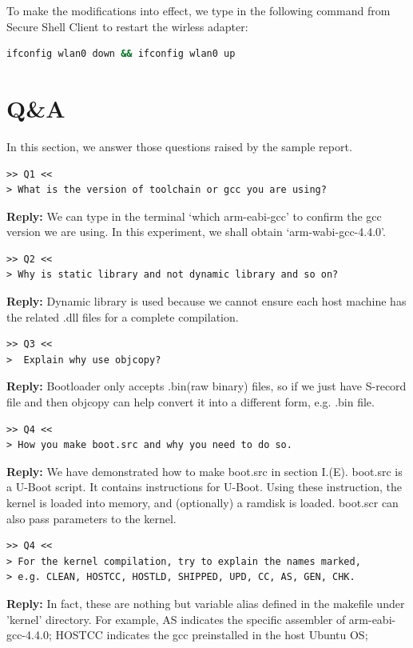 \documentclass[12pt,journal,draftclsnofoot,onecolumn]{IEEEtran}
\begin{document}
To make the modifications into effect, we type in the following command from Secure Shell Client to restart the wirless adapter:
\begin{lstlisting}[language={bash}]
ifconfig wlan0 down && ifconfig wlan0 up
\end{lstlisting}






\section{Q\&A}\label{Con}
In this section, we answer those questions raised by the sample report.

\begin{verbatim}
>> Q1 <<
> What is the version of toolchain or gcc you are using?
\end{verbatim}
\textbf{Reply:} We can type in the terminal `which arm-eabi-gcc' to confirm the gcc version we are 
using. In this experiment, we shall obtain `arm-wabi-gcc-4.4.0'.

\begin{verbatim}
>> Q2 <<
> Why is static library and not dynamic library and so on?
\end{verbatim}
\textbf{Reply:} Dynamic library is used because we cannot ensure each host machine has 
the related .dll files for a complete compilation. 

\begin{verbatim}
>> Q3 <<
>  Explain why use objcopy?
\end{verbatim}
\textbf{Reply:} Bootloader only accepts .bin(raw binary) files, so if we just have S-record file and then 
objcopy can help convert it into a different form, e.g. .bin file.

\begin{verbatim}
>> Q4 <<
> How you make boot.src and why you need to do so.
\end{verbatim}
\textbf{Reply:} We have demonstrated how to make boot.src in section I.(E). 
boot.src is a U-Boot script. It contains instructions for U-Boot. Using these instruction, the kernel is loaded into memory, and (optionally) a ramdisk is loaded. boot.scr can also pass parameters to the kernel.

\begin{verbatim}
>> Q4 <<
> For the kernel compilation, try to explain the names marked, 
> e.g. CLEAN, HOSTCC, HOSTLD, SHIPPED, UPD, CC, AS, GEN, CHK.
\end{verbatim}
\textbf{Reply:} In fact, these are nothing but variable alias defined in the makefile under 'kernel' directory.
For example, AS indicates the specific assembler of arm-eabi-gcc-4.4.0; HOSTCC indicates the gcc preinstalled
in the host Ubuntu OS; 


%
%
\clearpage
\end{document}
